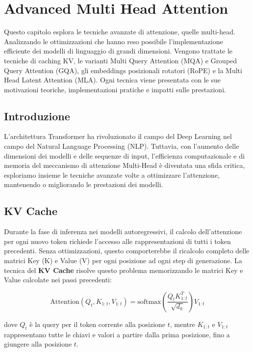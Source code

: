 \chapter{Advanced Multi Head Attention}
Questo capitolo esplora le tecniche avanzate di attenzione, quelle multi-head. Analizzando le ottimizzazioni che hanno reso possibile l'implementazione efficiente dei modelli di linguaggio di grandi dimensioni. Vengono trattate le tecniche di caching KV, le varianti Multi Query Attention (MQA) e Grouped Query Attention (GQA), gli embeddings posizionali rotatori (RoPE) e la Multi Head Latent Attention (MLA). Ogni tecnica viene presentata con le sue motivazioni teoriche, implementazioni pratiche e impatti sulle prestazioni.


\section{Introduzione}

L'architettura Transformer ha rivoluzionato il campo del Deep Learning nel campo del Natural Language Processing (NLP). Tuttavia, con l'aumento delle dimensioni dei modelli e delle sequenze di input, l'efficienza computazionale e di memoria del meccanismo di attenzione Multi-Head è diventata una sfida critica, esploriamo insieme le tecniche avanzate volte a ottimizzare l'attenzione, mantenendo o migliorando le prestazioni dei modelli.

\section{KV Cache}

Durante la fase di inferenza nei modelli autoregressivi, il calcolo dell'attenzione per ogni nuovo token richiede l'accesso alle rappresentazioni di tutti i token precedenti. Senza ottimizzazioni, questo comporterebbe il ricalcolo completo delle matrici Key (K) e Value (V) per ogni posizione ad ogni step di generazione. La tecnica del \textbf{KV Cache} risolve questo problema memorizzando le matrici Key e Value calcolate nei passi precedenti:

\begin{equation}
    \text{Attention}(Q_t, K_{1:t}, V_{1:t}) = \text{softmax}\left(\frac{Q_t K_{1:t}^T}{\sqrt{d_k}}\right) V_{1:t}
\end{equation}

dove $Q_t$ è la query per il token corrente alla posizione $t$, mentre $K_{1:t}$ e $V_{1:t}$ rappresentano tutte le chiavi e valori a partire dalla prima posizione, fino a giungere alla posizione $t$.

